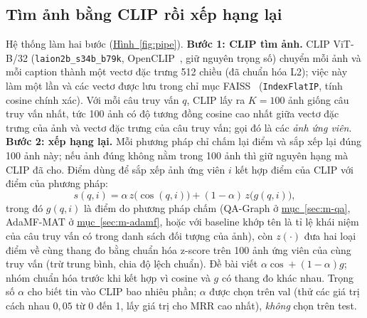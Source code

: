 \documentclass[conference]{IEEEtran}
\begin{document}
\subsection{Tìm ảnh bằng CLIP rồi xếp hạng lại}\label{sec:m-clip}
Hệ thống làm hai bước (\hyperref[fig:pipe]{Hình~\ref*{fig:pipe}}). \textbf{Bước 1: CLIP tìm ảnh.} CLIP ViT-B/32 (\texttt{laion2b\_s34b\_b79k}, OpenCLIP~\cite{openclip}, giữ nguyên trọng số) chuyển mỗi ảnh và mỗi caption thành một vectơ đặc trưng 512 chiều (đã chuẩn hóa L2); việc này làm một lần và các vectơ được lưu trong chỉ mục FAISS~\cite{faiss} (\texttt{IndexFlatIP}, tính cosine chính xác). Với mỗi câu truy vấn $q$, CLIP lấy ra $K{=}100$ ảnh giống câu truy vấn nhất, tức 100 ảnh có độ tương đồng cosine cao nhất giữa vectơ đặc trưng của ảnh và vectơ đặc trưng của câu truy vấn; gọi đó là các \emph{ảnh ứng viên}. \textbf{Bước 2: xếp hạng lại.} Mỗi phương pháp chỉ chấm lại điểm và sắp xếp lại đúng 100 ảnh này; nếu ảnh đúng không nằm trong 100 ảnh thì giữ nguyên hạng mà CLIP đã cho. Điểm dùng để sắp xếp ảnh ứng viên $i$ kết hợp điểm của CLIP với điểm của phương pháp:
\begin{equation}\label{eq:fuse}
s(q,i)=\alpha\,z\big(\cos(q,i)\big)+(1-\alpha)\,z\big(g(q,i)\big),
\end{equation}
trong đó $g(q,i)$ là điểm do phương pháp chấm (QA-Graph ở \hyperref[sec:m-qa]{mục~\ref*{sec:m-qa}}, AdaMF-MAT ở \hyperref[sec:m-adamf]{mục~\ref*{sec:m-adamf}}, hoặc với baseline khớp tên là tỉ lệ khái niệm của câu truy vấn có trong danh sách đối tượng của ảnh), còn $z(\cdot)$ đưa hai loại điểm về cùng thang đo bằng chuẩn hóa z-score trên 100 ảnh ứng viên của cùng truy vấn (trừ trung bình, chia độ lệch chuẩn). Đề bài viết $\alpha\cos+(1-\alpha)g$; nhóm chuẩn hóa trước khi kết hợp vì cosine và $g$ có thang đo khác nhau. Trọng số $\alpha$ cho biết tin vào CLIP bao nhiêu phần; $\alpha$ được chọn trên val (thử các giá trị cách nhau $0{,}05$ từ 0 đến 1, lấy giá trị cho MRR cao nhất), \emph{không} chọn trên test.
\end{document}
